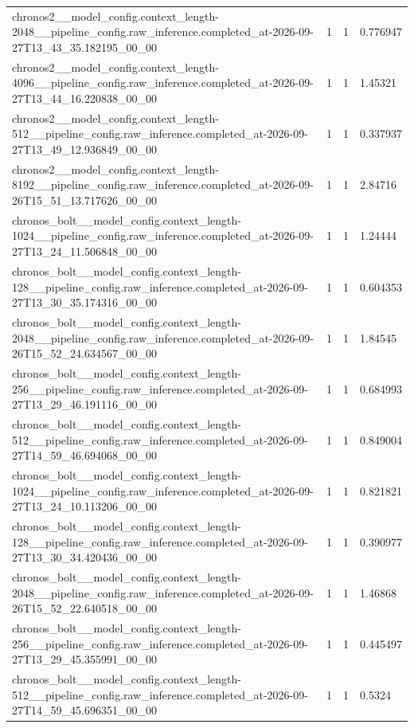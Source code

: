 \begin{tabular}{llll}
chronos2\_\_model\_config.context\_length-2048\_\_pipeline\_config.raw\_inference.completed\_at-2026-09-27T13\_43\_35.182195\_00\_00 & 1 & 1 & 0.776947 \\
chronos2\_\_model\_config.context\_length-4096\_\_pipeline\_config.raw\_inference.completed\_at-2026-09-27T13\_44\_16.220838\_00\_00 & 1 & 1 & 1.45321 \\
chronos2\_\_model\_config.context\_length-512\_\_pipeline\_config.raw\_inference.completed\_at-2026-09-27T13\_49\_12.936849\_00\_00 & 1 & 1 & 0.337937 \\
chronos2\_\_model\_config.context\_length-8192\_\_pipeline\_config.raw\_inference.completed\_at-2026-09-26T15\_51\_13.717626\_00\_00 & 1 & 1 & 2.84716 \\
chronos\_bolt\_\_model\_config.context\_length-1024\_\_pipeline\_config.raw\_inference.completed\_at-2026-09-27T13\_24\_11.506848\_00\_00 & 1 & 1 & 1.24444 \\
chronos\_bolt\_\_model\_config.context\_length-128\_\_pipeline\_config.raw\_inference.completed\_at-2026-09-27T13\_30\_35.174316\_00\_00 & 1 & 1 & 0.604353 \\
chronos\_bolt\_\_model\_config.context\_length-2048\_\_pipeline\_config.raw\_inference.completed\_at-2026-09-26T15\_52\_24.634567\_00\_00 & 1 & 1 & 1.84545 \\
chronos\_bolt\_\_model\_config.context\_length-256\_\_pipeline\_config.raw\_inference.completed\_at-2026-09-27T13\_29\_46.191116\_00\_00 & 1 & 1 & 0.684993 \\
chronos\_bolt\_\_model\_config.context\_length-512\_\_pipeline\_config.raw\_inference.completed\_at-2026-09-27T14\_59\_46.694068\_00\_00 & 1 & 1 & 0.849004 \\
chronos\_bolt\_\_model\_config.context\_length-1024\_\_pipeline\_config.raw\_inference.completed\_at-2026-09-27T13\_24\_10.113206\_00\_00 & 1 & 1 & 0.821821 \\
chronos\_bolt\_\_model\_config.context\_length-128\_\_pipeline\_config.raw\_inference.completed\_at-2026-09-27T13\_30\_34.420436\_00\_00 & 1 & 1 & 0.390977 \\
chronos\_bolt\_\_model\_config.context\_length-2048\_\_pipeline\_config.raw\_inference.completed\_at-2026-09-26T15\_52\_22.640518\_00\_00 & 1 & 1 & 1.46868 \\
chronos\_bolt\_\_model\_config.context\_length-256\_\_pipeline\_config.raw\_inference.completed\_at-2026-09-27T13\_29\_45.355991\_00\_00 & 1 & 1 & 0.445497 \\
chronos\_bolt\_\_model\_config.context\_length-512\_\_pipeline\_config.raw\_inference.completed\_at-2026-09-27T14\_59\_45.696351\_00\_00 & 1 & 1 & 0.5324 \\

\end{tabular}
